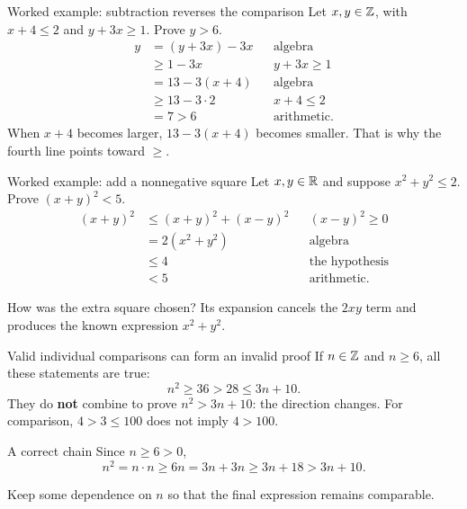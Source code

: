 \begin{frame}{Worked example: subtraction reverses the comparison}
Let $x,y\in\mathbb{Z}$, with $x+4\le2$ and $y+3x\ge1$. Prove $y>6$.
\[
\begin{aligned}
y&=(y+3x)-3x&&\text{algebra}\\
 &\ge1-3x&&y+3x\ge1\\
 &=13-3(x+4)&&\text{algebra}\\
 &\ge13-3\cdot2&&x+4\le2\\
 &=7>6&&\text{arithmetic}.
\end{aligned}
\]
When $x+4$ becomes larger, $13-3(x+4)$ becomes smaller.
That is why the fourth line points toward $\ge$.
\end{frame}

\begin{frame}{Worked example: add a nonnegative square}
Let $x,y\in\mathbb{R}$ and suppose $x^2+y^2\le2$. Prove $(x+y)^2<5$.
\[
\begin{aligned}
(x+y)^2&\le (x+y)^2+(x-y)^2&&(x-y)^2\ge0\\
       &=2(x^2+y^2)&&\text{algebra}\\
       &\le4&&\text{the hypothesis}\\
       &<5&&\text{arithmetic}.
\end{aligned}
\]
\begin{block}{How was the extra square chosen?}
Its expansion cancels the $2xy$ term and produces the known expression $x^2+y^2$.
\end{block}
\end{frame}

\begin{frame}{Valid individual comparisons can form an invalid proof}
If $n\in\mathbb{Z}$ and $n\ge6$, all these statements are true:
\[
n^2\ge36>28\le3n+10.
\]
They do \textbf{not} combine to prove $n^2>3n+10$: the direction changes.
For comparison, $4>3\le100$ does not imply $4>100$.
\begin{block}{A correct chain}
Since $n\ge6>0$,
\[
n^2=n\cdot n\ge6n=3n+3n\ge3n+18>3n+10.
\]
\end{block}
Keep some dependence on $n$ so that the final expression remains comparable.
\end{frame}

